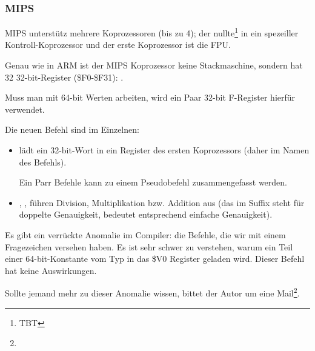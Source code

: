 \subsubsection{MIPS}

MIPS unterstütz mehrere Koprozessoren (bis zu 4); der nullte\footnote{TBT} in ein spezeiller
Kontroll-Koprozessor und der erste Koprozessor ist die FPU.

Genau wie in ARM ist der MIPS Koprozessor keine Stackmaschine, sondern hat 32
32-bit-Register (\$F0-\$F31):
.

Muss man mit 64-bit \Tdouble Werten arbeiten, wird ein Paar 32-bit F-Register
hierfür verwendet.



Die neuen Befehl sind im Einzelnen:

\begin{itemize}

\item {} lädt ein 32-bit-Wort in ein Register des ersten Koprozessors
(daher  im Namen des Befehls).

Ein Parr  Befehle kann zu einem  Pseudobefehl zusammengefasst
werden.

\item {}, ,  führen Division, Multiplikation bzw.
Addition aus (das  im Suffix steht für doppelte Genauigkeit, 
bedeutet entsprechend einfache Genauigkeit).

\end{itemize}

\myindex{\CompilerAnomaly}
\label{MIPS_FPU_LUI}
Es gibt ein verrückte Anomalie im Compiler: die  Befehle, die wir mit
einem Fragezeichen versehen haben. 
Es ist sehr schwer zu verstehen, warum ein Teil einer
64-bit-Konstante vom Typ \Tdouble in das \$V0 Register geladen wird. 
Dieser Befehl hat keine Auswirkungen. 

Sollte jemand mehr zu dieser Anomalie wissen, bittet der Autor um eine
Mail\footnote{\EMAILS}.

